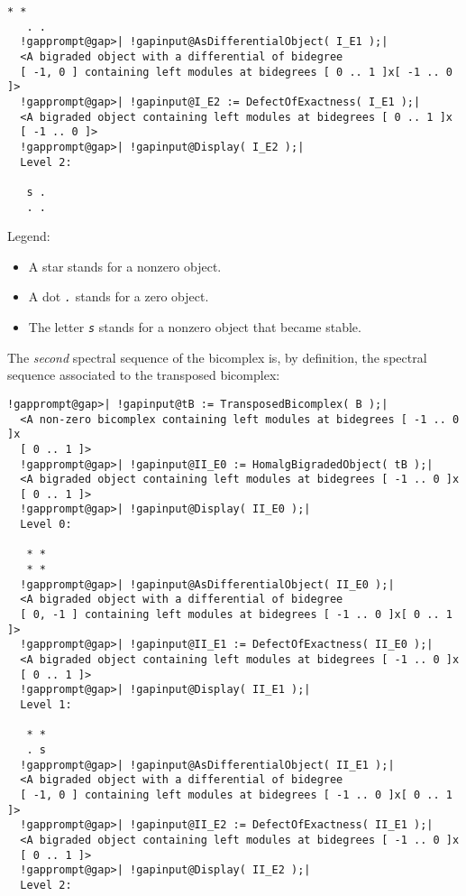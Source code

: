 \documentclass[a4paper,11pt]{report}
\begin{document}
{{{\begin{Verbatim}[commandchars=!@|,fontsize=\small,frame=single,label=Example]
   * *
   . .
  !gapprompt@gap>| !gapinput@AsDifferentialObject( I_E1 );|
  <A bigraded object with a differential of bidegree
  [ -1, 0 ] containing left modules at bidegrees [ 0 .. 1 ]x[ -1 .. 0 ]>
  !gapprompt@gap>| !gapinput@I_E2 := DefectOfExactness( I_E1 );|
  <A bigraded object containing left modules at bidegrees [ 0 .. 1 ]x
  [ -1 .. 0 ]>
  !gapprompt@gap>| !gapinput@Display( I_E2 );|
  Level 2:
  
   s .
   . .
\end{Verbatim}
 Legend: 
\begin{itemize}
\item A star \mbox{\texttt{\mdseries\slshape *}} stands for a nonzero object.
\item A dot \mbox{\texttt{\mdseries\slshape .}} stands for a zero object.
\item The letter \mbox{\texttt{\mdseries\slshape s}} stands for a nonzero object that became stable.
\end{itemize}
 

 The \emph{second} spectral sequence of the bicomplex is, by definition, the spectral sequence
associated to the transposed bicomplex: 
\begin{Verbatim}[commandchars=!@|,fontsize=\small,frame=single,label=Example]
  !gapprompt@gap>| !gapinput@tB := TransposedBicomplex( B );|
  <A non-zero bicomplex containing left modules at bidegrees [ -1 .. 0 ]x
  [ 0 .. 1 ]>
  !gapprompt@gap>| !gapinput@II_E0 := HomalgBigradedObject( tB );|
  <A bigraded object containing left modules at bidegrees [ -1 .. 0 ]x
  [ 0 .. 1 ]>
  !gapprompt@gap>| !gapinput@Display( II_E0 );|
  Level 0:
  
   * *
   * *
  !gapprompt@gap>| !gapinput@AsDifferentialObject( II_E0 );|
  <A bigraded object with a differential of bidegree
  [ 0, -1 ] containing left modules at bidegrees [ -1 .. 0 ]x[ 0 .. 1 ]>
  !gapprompt@gap>| !gapinput@II_E1 := DefectOfExactness( II_E0 );|
  <A bigraded object containing left modules at bidegrees [ -1 .. 0 ]x
  [ 0 .. 1 ]>
  !gapprompt@gap>| !gapinput@Display( II_E1 );|
  Level 1:
  
   * *
   . s
  !gapprompt@gap>| !gapinput@AsDifferentialObject( II_E1 );|
  <A bigraded object with a differential of bidegree
  [ -1, 0 ] containing left modules at bidegrees [ -1 .. 0 ]x[ 0 .. 1 ]>
  !gapprompt@gap>| !gapinput@II_E2 := DefectOfExactness( II_E1 );|
  <A bigraded object containing left modules at bidegrees [ -1 .. 0 ]x
  [ 0 .. 1 ]>
  !gapprompt@gap>| !gapinput@Display( II_E2 );|
  Level 2:
  

\end{Verbatim}}}}
\end{document}
